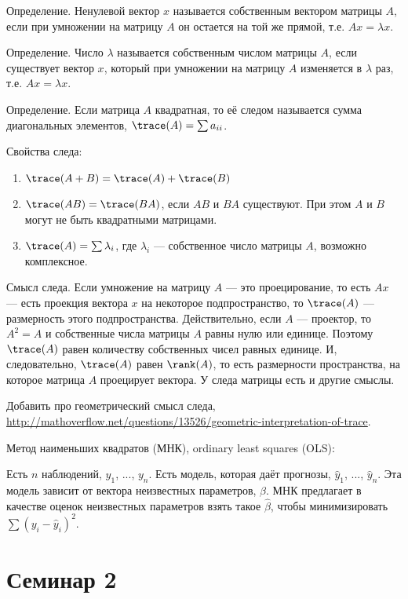 \documentclass[pdftex,12pt,a4paper]{article}
\def \hb{\hat{\beta}}
\begin{document}
Определение. Ненулевой вектор $x$ называется собственным вектором матрицы $A$, если при умножении на матрицу $A$ он остается на той же прямой, т.е. $Ax=\lambda x$.

Определение. Число $\lambda$ называется собственным числом матрицы $A$, если существует вектор $x$, который при умножении на матрицу $A$ изменяется в $\lambda$ раз, т.е. $Ax=\lambda x$.

Определение. Если матрица $A$ квадратная, то её следом называется сумма диагональных элементов, $\trace(A)=\sum a_{ii}$.

Свойства следа:
\begin{enumerate}
\item $\trace(A+B)=\trace(A)+\trace(B)$
\item $\trace(AB)=\trace(BA)$, если $AB$ и $BA$ существуют. При этом $A$ и $B$ могут не быть квадратными матрицами.
\item $\trace(A)=\sum \lambda_i$, где $\lambda_i$ --- собственное число матрицы $A$, возможно комплексное.
\end{enumerate}


Смысл следа. Если умножение на матрицу $A$ --- это проецирование, то есть $Ax$ --- есть проекция вектора $x$ на некоторое подпространство, то $\trace(A)$ --- размерность этого подпространства. Действительно, если $A$ --- проектор, то $A^2=A$ и собственные числа матрицы $A$ равны нулю или единице. Поэтому $\trace(A)$ равен количеству собственных чисел равных единице. И, следовательно, $\trace(A)$ равен $\rank(A)$, то есть размерности пространства, на которое матрица $A$ проецирует вектора. У следа матрицы есть и другие смыслы. 


Добавить про геометрический смысл следа, \url{http://mathoverflow.net/questions/13526/geometric-interpretation-of-trace}.







Метод наименьших квадратов (МНК), ordinary least squares (OLS):


Есть $n$ наблюдений, $y_1$, ..., $y_n$. Есть модель, которая даёт прогнозы, $\hat{y}_1$, ..., $\hat{y}_n$. Эта модель зависит от вектора неизвестных параметров, $\beta$. МНК предлагает в качестве оценок неизвестных параметров взять такое $\hb$, чтобы минимизировать $\sum (y_i-\hat{y}_i)^2$.

\section{Семинар 2}
\end{document}
